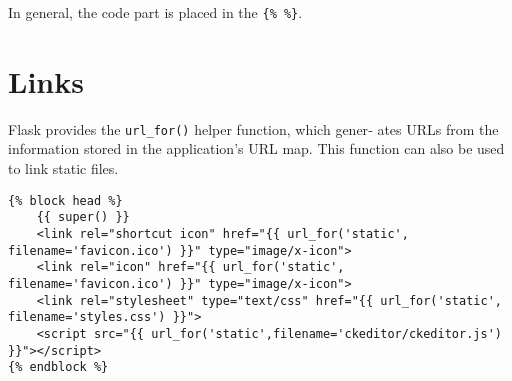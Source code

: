In general, the code part is placed in the \lstinline|{% %}|.

\section{Links}
\label{sec:links}

Flask provides the \lstinline|url_for()| helper function, which gener‐ ates URLs from the information stored in the application's URL map.
This function can also be used to link static files.

\begin{lstlisting}
{% block head %}
    {{ super() }}
    <link rel="shortcut icon" href="{{ url_for('static', filename='favicon.ico') }}" type="image/x-icon">
    <link rel="icon" href="{{ url_for('static', filename='favicon.ico') }}" type="image/x-icon">
    <link rel="stylesheet" type="text/css" href="{{ url_for('static', filename='styles.css') }}">
    <script src="{{ url_for('static',filename='ckeditor/ckeditor.js') }}"></script>
{% endblock %}
\end{lstlisting}

